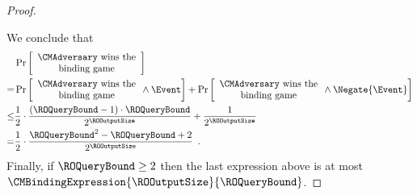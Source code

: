 \begin{proof}
\begin{itemize}
\end{itemize}
We conclude that
\begin{align*}
&\Pr\left[
\begin{array}{c}
\text{$\CMAdversary$ wins the} \\
\text{binding game}
\end{array}
\right] \\
=&
\Pr\left[
\begin{array}{c}
\text{$\CMAdversary$ wins the} \\
\text{binding game}
\end{array}
\land
\Event
\right]
+
\Pr\left[
\begin{array}{c}
\text{$\CMAdversary$ wins the} \\
\text{binding game}
\end{array}
\land
\Negate{\Event}
\right]
\\ \leq &
\frac{1}{2} \cdot \frac{(\ROQueryBound-1) \cdot \ROQueryBound}{2^{\ROOutputSize}} + \frac{1}{2^{\ROOutputSize}}
\\ = &
\frac{1}{2} \cdot \frac{\ROQueryBound^2 - \ROQueryBound + 2}{2^{\ROOutputSize}}
\enspace.
\end{align*}
Finally, if $\ROQueryBound \geq 2$ then the last expression above is at most $\CMBindingExpression{\ROOutputSize}{\ROQueryBound}$.
\end{proof}

